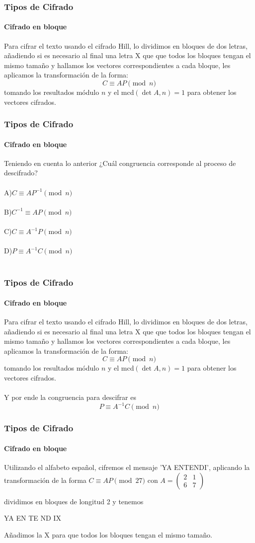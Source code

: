 \documentclass[spanish, mexico]{beamer}
\begin{document}
	\begin{frame}
		\frametitle{Tipos de Cifrado}
		\framesubtitle{Cifrado en bloque}
		 Para cifrar el texto usando el cifrado Hill, lo dividimos en bloques de dos letras, añadiendo si es necesario al final una letra X que que todos los bloques tengan el mismo tamaño y hallamos los vectores correspondientes a cada bloque, les aplicamos la transformación de la forma:
		 $$C \equiv AP \pmod{n}$$
		 tomando los resultados módulo $n$ y el mcd$(\det A, n) = 1$ para obtener los vectores cifrados.
	\end{frame}
	
	\begin{frame}
		\frametitle{Tipos de Cifrado}
		\framesubtitle{Cifrado en bloque}
		 Teniendo en cuenta lo anterior ¿Cuál congruencia corresponde al proceso de descifrado?\\~\\
		 A)$C \equiv AP^{-1} \pmod{n}$\\~\\
		 B)$C^{-1} \equiv AP \pmod{n}$\\~\\
		 C)$C \equiv A^{-1}P \pmod{n}$\\~\\
		 D)$P \equiv A^{-1}C \pmod{n}$\\~\\
	\end{frame}
	
	\begin{frame}
		\frametitle{Tipos de Cifrado}
		\framesubtitle{Cifrado en bloque}
		 Para cifrar el texto usando el cifrado Hill, lo dividimos en bloques de dos letras, añadiendo si es necesario al final una letra X que que todos los bloques tengan el mismo tamaño y hallamos los vectores correspondientes a cada bloque, les aplicamos la transformación de la forma:
		 $$C \equiv AP \pmod{n}$$
		 tomando los resultados módulo $n$ y el mcd$(\det A, n) = 1$ para obtener los vectores cifrados.\\~\\
		 Y por ende la congruencia para descifrar es
		 $$P \equiv A^{-1}C \pmod{n}$$
	\end{frame}
	
	\begin{frame}
		\frametitle{Tipos de Cifrado}
		\framesubtitle{Cifrado en bloque}
		 \begin{example}
		    Utilizando el alfabeto español, cifremos el mensaje 'YA ENTENDI', aplicando la transformación de la forma $C \equiv AP \pmod{27}$ con $A = \begin{pmatrix}2 & 1\\ 6 & 7\end{pmatrix}$
		 \end{example}
		 \begin{solution}
		    dividimos en bloques de longitud 2 y tenemos
		    \begin{center}
		        YA EN TE ND IX
		    \end{center}
		    Añadimos la X para que todos los bloques tengan el mismo tamaño.
		 \end{solution}
	\end{frame}
	
\end{document}
